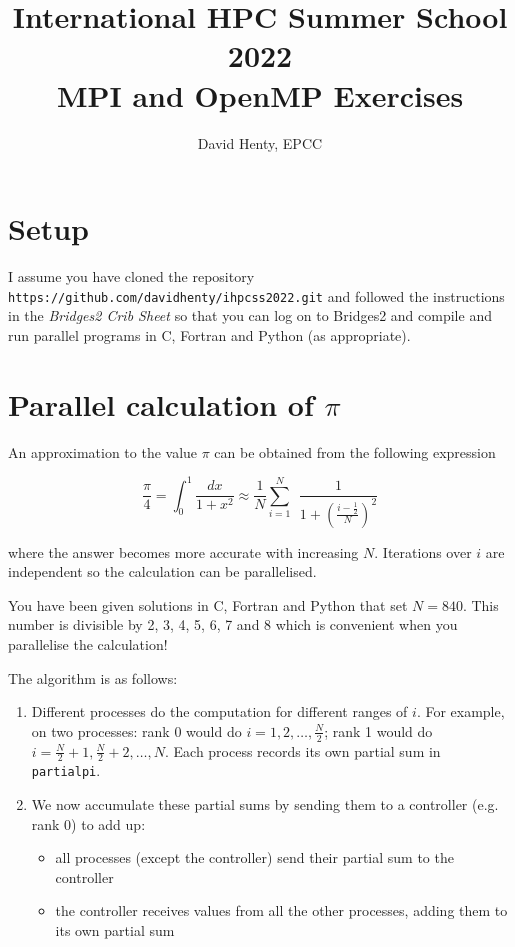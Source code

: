 \documentclass{article}
\title{International HPC Summer School 2022 \\
  MPI and OpenMP Exercises}
\begin{document}
\author{David Henty, EPCC}

\date{}

\makeEPCCtitle

\vspace{-1.0cm}

\section{Setup}

I assume you have cloned the repository
\texttt{https://github.com/davidhenty/ihpcss2022.git} and followed the
instructions in the {\em Bridges2 Crib Sheet} so that you can log on
to Bridges2 and compile and run parallel programs in C, Fortran and
Python (as appropriate).

\section{Parallel calculation of $\pi$}

An approximation to the value $\pi$ can be obtained from the
following expression

\[
\frac{\pi}{4} = \int_0^1 \frac{dx}{1 + x^2}
\approx \frac{1}{N} \sum_{i=1}^{N} \ \ \frac{1}{1 + \left(
\frac{i-\frac{1}{2}}{N} \right) ^2}
\]

where the answer becomes more accurate with increasing $N$. Iterations
over $i$ are independent so the calculation can be parallelised.

You have been given solutions in C, Fortran and Python that set $N =
840$. This number is divisible by 2, 3, 4, 5, 6, 7 and 8 which is
convenient when you parallelise the calculation!

The algorithm is as follows:

\begin{enumerate}

\item Different processes do the computation for different ranges of
  $i$. For example, on two processes: rank 0 would do $i = 1, 2,
  \ldots, \frac{N}{2}$; rank 1 would do $i = \frac{N}{2}+1,
  \frac{N}{2}+2, \ldots, N$. Each process records its own partial sum
  in \texttt{partialpi}.

\item We now accumulate these partial sums by sending them to
a controller (e.g. rank 0) to add up:

\begin{itemize}

\item all processes (except the controller) send their partial sum to the
controller

\item the controller receives values from all the other processes,
adding them to its own partial sum

\end{itemize}

\end{enumerate}
\end{document}
